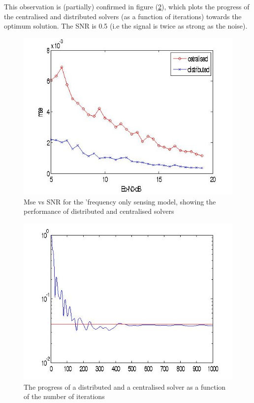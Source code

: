 \documentclass[conference]{IEEEtran}
\begin{document}
This observation is (partially) confirmed in figure (\ref{erroriterations}), which plots the progress of the centralised and distributed solvers (as a function of iterations) towards the optimum solution. The SNR is 0.5 (i.e the signal is twice as strong as the noise).

\begin{figure}[h]
\centering
\includegraphics[height = 5 cm]{centvsdistmsegaussian10perpoint.jpg}
\caption{Mse vs SNR for the 'frequency only sensing model, showing the performance of distributed and centralised solvers}
\label{msevssnr1}
\end{figure}

\begin{figure}[h]
\centering
\includegraphics[height = 5 cm]{erroriterations1.jpg}
\caption{The progress of a distributed and a centralised solver as a function of the number of iterations }
\label{erroriterations}
\end{figure}


\end{document}
